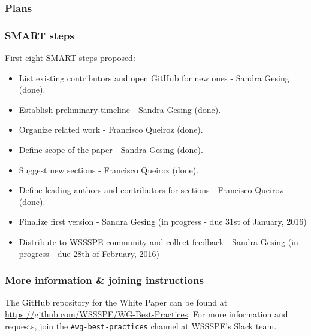 \subsubsection{Plans}


\subsubsection{SMART steps}

First eight SMART steps proposed: \\
\begin{itemize}
\item List existing contributors and open GitHub for new ones - Sandra Gesing (done).
\item Establish preliminary timeline  - Sandra Gesing (done).
\item Organize related work - Francisco Queiroz (done).
\item Define scope of the paper - Sandra Gesing (done).
\item Suggest new sections - Francisco Queiroz (done).
\item Define leading authors and contributors for sections - Francisco Queiroz (done).
\item Finalize first version - Sandra Gesing (in progress - due 31st of January, 2016)
\item Distribute to WSSSPE community and collect feedback - Sandra Gesing (in progress - due 28th of February, 2016)
\end{itemize}

\subsubsection{More information \& joining instructions}

The GitHub repository for the White Paper can be found at \url{https://github.com/WSSSPE/WG-Best-Practices}. For more information and requests, join the \texttt{\#wg-best-practices} channel at WSSSPE's Slack team.
